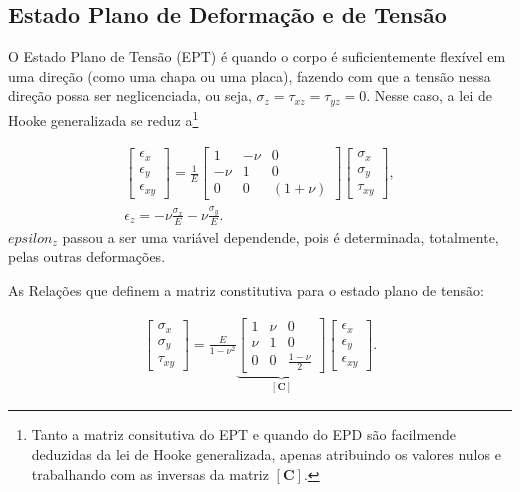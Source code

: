 \subsection{Estado Plano de Deformação e de Tensão}

O Estado Plano de Tensão (EPT) é quando o corpo é suficientemente flexível em uma direção (como uma chapa ou uma placa), fazendo com que a tensão nessa direção possa ser neglicenciada, ou seja, $\sigma_z = \tau_{xz} = \tau_{yz} = 0$. Nesse caso, a lei de Hooke generalizada se reduz a\footnote{Tanto a matriz consitutiva do EPT e quando do EPD são facilmende deduzidas da lei de Hooke generalizada, apenas atribuindo os valores nulos e trabalhando com as inversas da matriz $[\bm{C}]$.}

\begin{gather}
    \begin{bmatrix}
        \epsilon_x \\
        \epsilon_y \\
        \epsilon_{xy}
    \end{bmatrix} = \frac{1}{E} \begin{bmatrix}
        1 & -\nu & 0 \\
        -\nu & 1 & 0 \\
        0 & 0 & (1+\nu)
    \end{bmatrix}
    \begin{bmatrix}
        \sigma_x \\
        \sigma_y \\
        \tau_{xy}
    \end{bmatrix}, \\
    \epsilon_z = -\nu \frac{\sigma_x}{E} - \nu \frac{\sigma_y}{E}.
\end{gather}
$epsilon_z$ passou a ser uma variável dependende, pois é determinada, totalmente, pelas outras deformações.

As Relações que definem a matriz constitutiva para o estado plano de tensão:

\begin{gather}
    \begin{bmatrix}
        \sigma_x \\
        \sigma_y \\
        \tau_{xy}
    \end{bmatrix} = \frac{E}{1-\nu^2} 
    \underbrace{\begin{bmatrix}
        1 & \nu & 0 \\
        \nu & 1 & 0 \\
        0 & 0 & \frac{1-\nu}{2}
    \end{bmatrix}}_{[\bm{C}]}
    \begin{bmatrix}
        \epsilon_x \\
        \epsilon_y \\
        \epsilon_{xy}
    \end{bmatrix}.
\end{gather}

